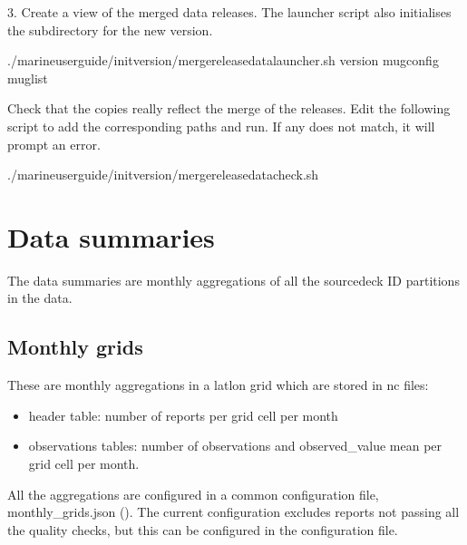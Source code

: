 \documentclass[letterpaper,10pt,english]{sphinxmanual}
\begin{document}
3. Create a view of the merged data releases. The launcher script also initialises the subdirectory for the new version.

\begin{sphinxVerbatim}[commandchars=\\\{\}]
./marine\PYGZhy{}user\PYGZhy{}guide/init\PYGZus{}version/merge\PYGZus{}release\PYGZus{}data\PYGZus{}launcher.sh version mug\PYGZus{}config mug\PYGZus{}list
\end{sphinxVerbatim}

Check that the copies really reflect the merge of the releases. Edit the following script to add the corresponding paths and run. If any does not match, it will prompt an error.

\begin{sphinxVerbatim}[commandchars=\\\{\}]
./marine\PYGZhy{}user\PYGZhy{}guide/init\PYGZus{}version/merge\PYGZus{}release\PYGZus{}data\PYGZus{}check.sh
\end{sphinxVerbatim}


\chapter{Data summaries}
\label{\detokenize{index:data-summaries}}
The data summaries are monthly aggregations of all the source\sphinxhyphen{}deck ID partitions
in the data.


\section{Monthly grids}
\label{\detokenize{index:monthly-grids}}
These are monthly aggregations in a lat\sphinxhyphen{}lon grid which are stored in nc files:
\begin{itemize}
\item {} 
header table: number of reports per grid cell per month

\item {} 
observations tables: number of observations and observed\_value mean per grid cell per month.

\end{itemize}

All the aggregations are configured in a common configuration file, monthly\_grids.json ({\hyperref[\detokenize{index:mon-grids-config}]{}}). The current configuration excludes
reports not passing all the quality checks, but this can be configured in the
configuration file.
\end{document}
